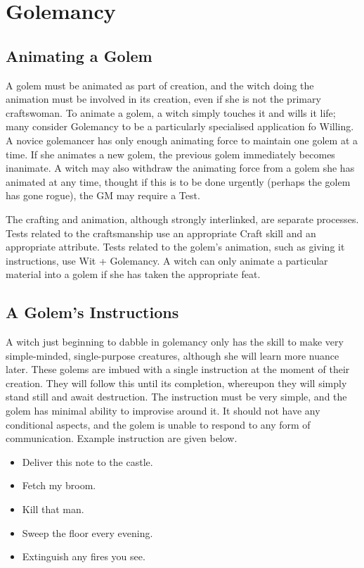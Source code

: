\chapter{Golemancy}

\section{Animating a Golem}

A golem must be animated as part of creation, and the witch doing the animation must be involved in its creation, even if she is not the primary craftswoman.
To animate a golem, a witch simply touches it and wills it life; many consider Golemancy to be a particularly specialised application fo Willing.
A novice golemancer has only enough animating force to maintain one golem at a time.
If she animates a new golem, the previous golem immediately becomes inanimate.
A witch may also withdraw the animating force from a golem she has animated at any time, thought if this is to be done urgently (perhaps the golem has gone rogue), the GM may require a Test.

The crafting and animation, although strongly interlinked, are separate processes.
Tests related to the craftsmanship use an appropriate Craft skill and an appropriate attribute.
Tests related to the golem's animation, such as giving it instructions, use Wit + Golemancy.
A witch can only animate a particular material into a golem if she has taken the appropriate feat.

\section{A Golem's Instructions}

A witch just beginning to dabble in golemancy only has the skill to make very simple-minded, single-purpose creatures, although she will learn more nuance later.
These golems are imbued with a single instruction at the moment of their creation.
They will follow this until its completion, whereupon they will simply stand still and await destruction.
The instruction must be very simple, and the golem has minimal ability to improvise around it.
It should not have any conditional aspects, and the golem is unable to respond to any form of communication.
Example instruction are given below.

\begin{itemize}
	\item Deliver this note to the castle.
	\item Fetch my broom.
	\item Kill that man.
	\item Sweep the floor every evening.
	\item Extinguish any fires you see.
\end{itemize}

